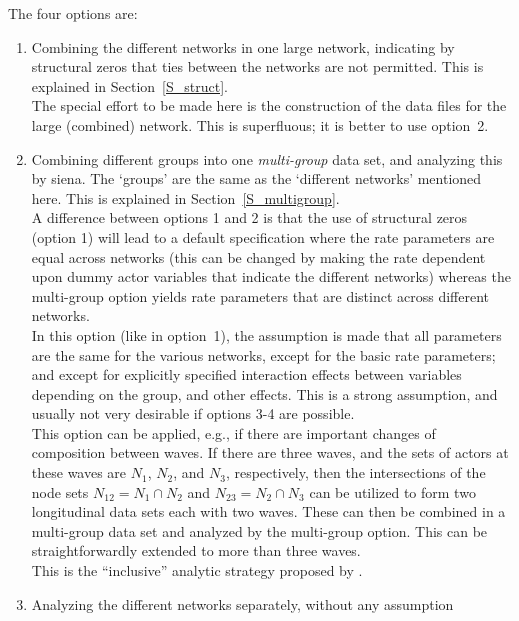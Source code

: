 \documentclass[a4paper,fleqn,11pt]{article}
\newcommand{\+}{\, + \,}
\begin{document}
\noindent
The four options are:
\begin{enumerate}
\item Combining the different networks in one large network,
      indicating by structural zeros that ties between the
      networks are not permitted.
      This is explained in Section~\ref{S_struct}.\\
      The special effort to be made here is the construction
      of the data files for the large (combined) network.
      This is superfluous; it is better to use option~2.
\item Combining different groups
      into one \emph{multi-group} data set,
      and analyzing this by \textsf{siena}.
      The `groups' are the same as the `different networks'
      mentioned here.
      This is explained in Section~\ref{S_multigroup}.\\
      A difference between options 1 and 2 is that the use
      of structural zeros (option 1) will lead to a default specification
      where the rate parameters are equal across networks
      (this can be changed by making the rate dependent upon dummy actor
      variables that indicate the different networks)
      whereas the multi-group option yields rate parameters
      that are distinct across different networks.\\
      In this option (like in option~1), the assumption is made that all
      parameters are the same for the various networks,
      except for the basic rate parameters;
      and except for explicitly specified interaction
      effects between variables depending on the group, and other effects.
      This is a strong assumption, and usually not very desirable if
      options 3-4 are possible.\\
      This option can be applied, e.g., if there are important changes
      of composition between waves. If there are three waves, and
      the sets of actors at these waves are $N_1$, $N_2$, and $N_3$,
      respectively, then the intersections of the node sets
      $N_{12} = N_1 \cap N_2$ and $N_{23} = N_2 \cap N_3$ can be
      utilized to form two longitudinal data sets each with two waves.
      These can then be combined in a multi-group data set
      and analyzed by the multi-group option.
      This can be straightforwardly extended to more than three waves.
      \\
      This is the ``inclusive'' analytic strategy
      proposed by \citet{delaHayeETAl2017}.
\item Analyzing the different networks separately, without any assumption

\end{enumerate}
\end{document}
